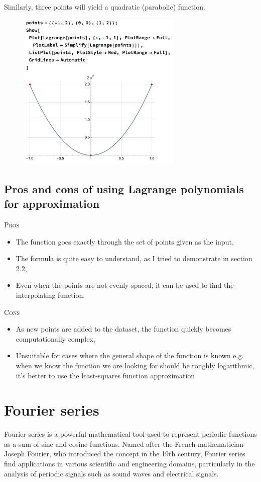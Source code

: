 \documentclass{MathematicaReport}
\begin{document}
Similarly, three points will yield a quadratic (parabolic) function.
\begin{figure}[H]
\centering
\includegraphics[width=0.7\textwidth]{images/lagrange_example4.png}
\end{figure}


\subsection{Pros and cons of using Lagrange polynomials for approximation}

\textsc{Pros}
\begin{itemize}
	\item The function goes exactly through the set of points given as the input,
	\item The formula is quite easy to understand, as I tried to demonstrate in
		section 2.2,
	\item Even when the points are not evenly spaced, it can be used to find the 
		interpolating function.
\end{itemize}

\textsc{Cons}
\begin{itemize}
	\item As new points are added to the dataset, the function quickly becomes
		computationally complex,
	\item Unsuitable for cases where the general shape of the function is known
		e.g. when we know the function we are looking for should be roughly
		logarithmic, it's better to use the least-squares function approximation
\end{itemize}

\section{Fourier series}
Fourier series is a powerful mathematical tool used to represent periodic
functions as a sum of sine and cosine functions. Named after the French
mathematician Joseph Fourier, who introduced the concept in the 19th century,
Fourier series find applications in various scientific and engineering domains,
particularly in the analysis of periodic signals such as sound waves and
electrical signals. \\
\end{document}
